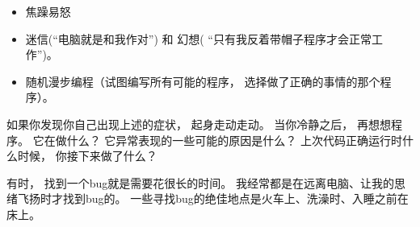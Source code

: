 \begin{itemize}


\item 焦躁易怒


\item 迷信(``电脑就是和我作对'') 和 幻想( ``只有我反着带帽子程序才会正常工作'')。  


\item 随机漫步编程（试图编写所有可能的程序， 选择做了正确的事情的那个程序）。  

\end{itemize}


如果你发现你自己出现上述的症状， 起身走动走动。  
当你冷静之后， 再想想程序。  它在做什么？  
它异常表现的一些可能的原因是什么？  
上次代码正确运行时什么时候， 你接下来做了什么？


有时， 找到一个bug就是需要花很长的时间。  
我经常都是在远离电脑、让我的思绪飞扬时才找到bug的。  
一些寻找bug的绝佳地点是火车上、洗澡时、入睡之前在床上。  


